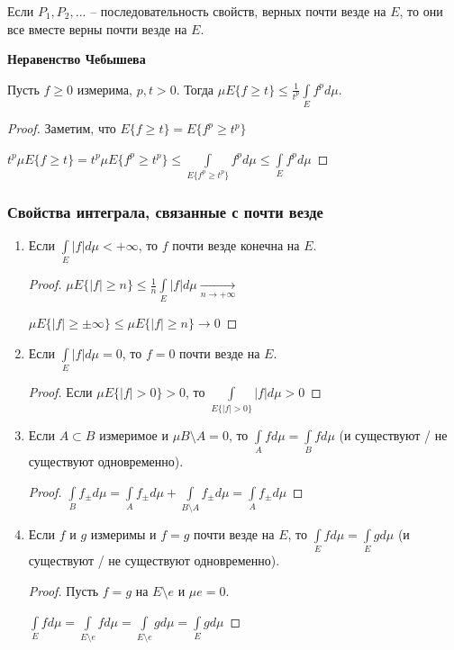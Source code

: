 \begin{remark}
    Если $P_1, P_2,...$ – последовательность свойств, верных почти везде на $E$, то они
    все вместе верны почти везде на $E$.
\end{remark}

\begin{theorem}
    \textbf{Неравенство Чебышева}

    Пусть $f\geq 0$ измерима, $p, t> 0$. Тогда $\mu E\{f\geq t\}\leq \frac{1}{t^p}
    \int\limits_Ef^p d\mu$.
\end{theorem}

\begin{proof}
    Заметим, что $E\{f\geq t\}=E\{f^p \geq t^p\}$

    $t^p\mu E\{f\geq t\}=t^p \mu E\{f^p\geq t^p\}\leq \int\limits_{E\{f^p\geq t^p\}} f^p d\mu 
    \leq \int\limits_E f^pd\mu$
\end{proof}

\subsubsection*{Свойства интеграла, связанные с почти везде}

\begin{enumerate}
    \item Если $\int\limits_E |f| d\mu <+\infty$, то $f$ почти везде конечна на $E$.
    
    \begin{proof}
        $\mu E\{|f|\geq n\}\leq \frac{1}{n}\int\limits_E |f|d\mu \underset
        {n\rightarrow +\infty}{\rightarrow}$

        $\mu E\{|f|\geq \pm \infty\}\leq \mu E\{|f|\geq n\}\rightarrow 0$
    \end{proof}

    \item Если $\int\limits_E |f| d\mu=0$, то $f=0$ почти везде на $E$.
    \begin{proof}
        Если $\mu E\{|f|>0\}>0$, то $\int\limits_{E\{|f|>0\}} |f| d\mu > 0$
    \end{proof}

    \item Если $A\subset B$ измеримое и $\mu B\setminus A=0$, то $\int\limits_A f d\mu=\int\limits_B f d\mu$
    (и существуют / не существуют одновременно).

    \begin{proof}
        $\int\limits_B f_\pm d\mu=\int\limits_A f_\pm d\mu+\int\limits_{B\setminus A} f_\pm d\mu=\int\limits_A f_\pm d\mu$
    \end{proof}

    \item Если $f$ и $g$ измеримы и $f=g$ почти везде на $E$, то $\int\limits_E fd\mu = \int\limits_E gd\mu$
    (и существуют / не существуют одновременно).

    \begin{proof}
        Пусть $f=g$ на $E\setminus e$ и $\mu e=0$.

        $\int\limits_E f d\mu=\int\limits_{E\setminus e} f d\mu = \int\limits_{E\setminus e} gd\mu = \int\limits_E g d\mu$
    \end{proof}
\end{enumerate}


